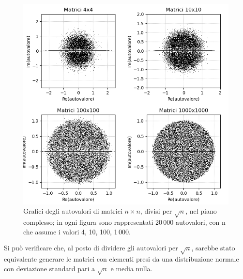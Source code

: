 \documentclass[a4paper]{article}
\newcounter{count_es}
\newcounter{count_sub_es}[count_es]
\begin{document}
\begin{figure}[H]
    \centering
    \includegraphics[width=.7\linewidth]{Es_1b.png}
    \caption{Grafici degli autovalori di matrici \(n \times n\), divisi per \(\sqrt{n}\),
    nel piano complesso; in ogni figura sono rappresentati 20\,000 autovalori, con n che assume i valori 4, 10, 100, 1\,000.  \label{fig:es_1b}}
\end{figure}
Si può verificare che, al posto di dividere gli autovalori per \(\sqrt{n}\), sarebbe stato equivalente generare
le matrici con elementi presi da una distribuzione normale con deviazione standard pari a \(\sqrt{n}\) e media nulla.
\end{document}
